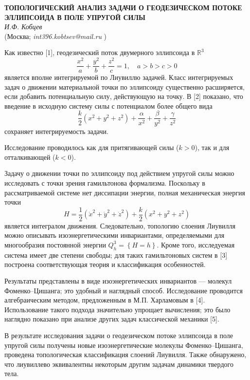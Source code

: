 \begin{center}{ \bf ТОПОЛОГИЧЕСКИЙ АНАЛИЗ ЗАДАЧИ О ГЕОДЕЗИЧЕСКОМ ПОТОКЕ ЭЛЛИПСОИДА В ПОЛЕ УПРУГОЙ СИЛЫ}\\
{\it И.Ф. Кобцев } \\
(Москва; {\it int396.kobtsev@mail.ru} )
\end{center}


Как известно [1], геодезический поток двумерного эллипсоида в $\mathbb{R}^3$
$$
\frac{x^2}{a}+\frac{y^2}{b}+\frac{z^2}{c}=1,\quad a>b>c>0
$$
является вполне интегрируемой по Лиувиллю задачей. Класс интегрируемых задач о движении материальной точки по эллипсоиду существенно расширяется, если добавить потенциальную силу, действующую на точку. В [2] показано, что введение в исходную систему силы с потенциалом более общего вида
$$
\frac{k}{2}\left( x^2+y^2+z^2\right)+\frac{\alpha}{x^2}+\frac{\beta}{y^2}+\frac{\gamma}{z^2}
$$
сохраняет интегрируемость задачи.

Исследование проводилось как для притягивающей силы ($k>0$), так и для отталкивающей ($k<0$).


Задачу о движении точки по эллипсоиду под действием упругой силы можно исследовать с точки зрения гамильтонова формализма. Поскольку в рассматриваемой системе нет диссипации энергии, полная механическая энергия точки
$$
H=\frac{1}{2}\left(\dot x^2+\dot y^2+\dot z^2\right)+\frac{k}{2}\left(x^2+y^2+z^2\right)
$$
является интегралом движения. Следовательно, топологию слоения Лиувилля можно описывать изоэнергетическими инвариантами, определяемыми для многообразия постоянной энергии $Q^3_h=\left\{H=h \right\}$. Кроме того, исследуемая система имеет две степени свободы; для таких гамильтоновых систем в [3] построена соответствующая теория и  классификация особенностей.


Результаты представлены в виде изоэнергетических инвариантов --- молекул Фоменко--Цишанга; это удобный и наглядный способ. Исследование проводится алгебраическим методом, предложенным в М.П. Харламовым в [4]. Использование такого подхода значительно упрощает вычисления; это было наглядно показано при анализе других задач классической механики [5].

В результате исследования задачи о геодезическом потоке эллипсоида в поле упругой силы получены новые изоэнергетические молекулы Фоменко--Цишанга, проведена топологическая классификация слоений Лиувилля. Также обнаружено, что лиувиллево эквивалентны некоторым другим задачам динамики твердого тела.


